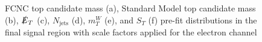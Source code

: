 \begin{figure}[]
\hfil  
{}
\caption{FCNC top candidate mass (a), Standard Model top candidate mass (b), $\slashed{E}_T$ (c), $N_\text{jets}$ (d),  $m_T^W$ (e), and $S_T$ (f) pre-fit distributions in the final signal region with scale factors applied for the electron channel}
\label{fig:SRej2}
\end{figure}



